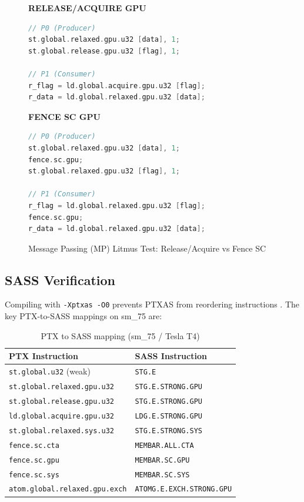 \documentclass[a4paper]{article}
\begin{document}
\begin{figure}[h]
\centering
\begin{minipage}{0.45\textwidth}
\centering
\textbf{RELEASE/ACQUIRE GPU}
\begin{lstlisting}[language=C]
// P0 (Producer)
st.global.relaxed.gpu.u32 [data], 1;
st.global.release.gpu.u32 [flag], 1;

// P1 (Consumer)
r_flag = ld.global.acquire.gpu.u32 [flag];
r_data = ld.global.relaxed.gpu.u32 [data];
\end{lstlisting}
\end{minipage}
\hfill
\begin{minipage}{0.45\textwidth}
\centering
\textbf{FENCE SC GPU}
\begin{lstlisting}[language=C]
// P0 (Producer)
st.global.relaxed.gpu.u32 [data], 1;
fence.sc.gpu;
st.global.relaxed.gpu.u32 [flag], 1;

// P1 (Consumer)
r_flag = ld.global.relaxed.gpu.u32 [flag];
fence.sc.gpu;
r_data = ld.global.relaxed.gpu.u32 [data];
\end{lstlisting}
\end{minipage}
\caption{Message Passing (MP) Litmus Test: Release/Acquire vs Fence SC}
\end{figure}

\subsection{SASS Verification}

Compiling with \texttt{-Xptxas -O0} prevents PTXAS from reordering instructions \cite{nvidia_ptx_isa}.
The key PTX-to-SASS mappings on sm\_75 are:

\begin{table}[h]
\centering
\small
\caption{PTX to SASS mapping (sm\_75 / Tesla T4)}
\label{tab:ptx-sass}
\begin{tabular}{ll}
\toprule
\textbf{PTX Instruction} & \textbf{SASS Instruction} \\
\midrule
\texttt{st.global.u32} (weak)             & \texttt{STG.E} \\
\texttt{st.global.relaxed.gpu.u32}        & \texttt{STG.E.STRONG.GPU} \\
\texttt{st.global.release.gpu.u32}        & \texttt{STG.E.STRONG.GPU} \\
\texttt{ld.global.acquire.gpu.u32}        & \texttt{LDG.E.STRONG.GPU} \\
\texttt{st.global.relaxed.sys.u32}        & \texttt{STG.E.STRONG.SYS} \\
\texttt{fence.sc.cta}                     & \texttt{MEMBAR.ALL.CTA} \\
\texttt{fence.sc.gpu}                     & \texttt{MEMBAR.SC.GPU} \\
\texttt{fence.sc.sys}                     & \texttt{MEMBAR.SC.SYS} \\
\texttt{atom.global.relaxed.gpu.exch}     & \texttt{ATOMG.E.EXCH.STRONG.GPU} \\
\bottomrule
\end{tabular}
\end{table}
\end{document}
